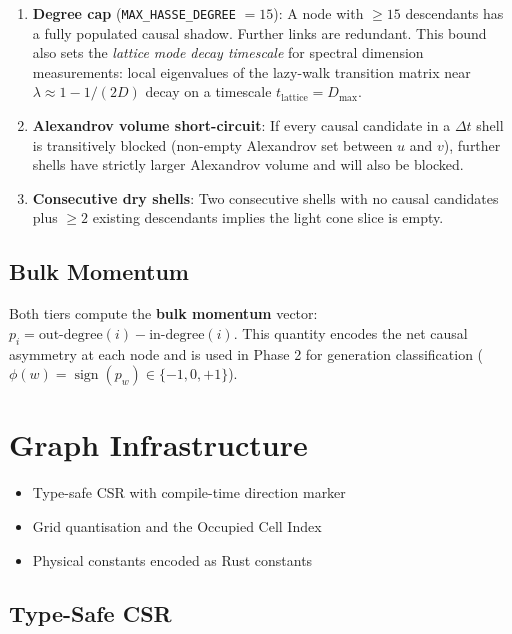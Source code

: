 \documentclass[11pt, a4paper, openany]{book}
\newcommand{\code}[1]{\texttt{#1}}
\newenvironment{introduction}[1][Chapter Overview]{%
  \begin{tcolorbox}[
    enhanced,colback=structure!5,colframe=structure,
    colbacktitle=structure,coltitle=white,
    fonttitle=\small\bfseries,title={#1},
    arc=2pt,boxrule=0.7pt,
    left=8pt,right=8pt,top=6pt,bottom=6pt,
    before skip=12pt,after skip=12pt
  ]\itshape\begin{itemize}[leftmargin=*,itemsep=2pt,parsep=0pt]
}{%
  \end{itemize}\end{tcolorbox}
}
\begin{document}
\begin{enumerate}
  \item \textbf{Degree cap} (\code{MAX\_HASSE\_DEGREE} $= 15$):
        A node with $\geq 15$ descendants has a fully populated causal shadow.
        Further links are redundant.  This bound also sets the
        \emph{lattice mode decay timescale} for spectral dimension measurements:
        local eigenvalues of the lazy-walk transition matrix near
        $\lambda \approx 1 - 1/(2D)$ decay on a timescale
        $t_{\text{lattice}} = D_{\max}$.
  \item \textbf{Alexandrov volume short-circuit}: If every causal candidate in
        a $\Delta t$ shell is transitively blocked (non-empty Alexandrov set
        between $u$ and $v$), further shells have strictly larger Alexandrov
        volume and will also be blocked.
  \item \textbf{Consecutive dry shells}: Two consecutive shells with no causal
        candidates plus $\geq 2$ existing descendants implies the light cone
        slice is empty.
\end{enumerate}

\section{Bulk Momentum}

Both tiers compute the \textbf{bulk momentum} vector: $p_i = \text{out-degree}(i)
- \text{in-degree}(i)$.  This quantity encodes the net causal asymmetry at each
node and is used in Phase 2 for generation classification ($\phi(w) =
\operatorname{sign}(p_w) \in \{-1, 0, +1\}$).


\chapter{Graph Infrastructure}

\begin{introduction}
  \item Type-safe CSR with compile-time direction marker
  \item Grid quantisation and the Occupied Cell Index
  \item Physical constants encoded as Rust constants
\end{introduction}

\section{Type-Safe CSR}
\end{document}
